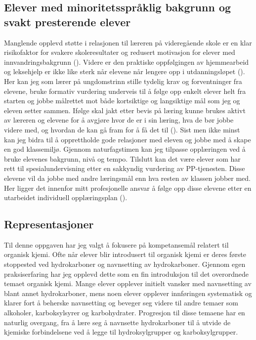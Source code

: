 \documentclass[main.tex]{subfiles}
\begin{document}
\subsection*{Elever med minoritetsspråklig bakgrunn og svakt presterende elever}

Manglende opplevd støtte i relasjonen til læreren på videregående skole er en klar risikofaktor for svakere skoleresultater og redusert motivasjon for elever med innvandringsbakgrunn (). Videre er den praktiske oppfølgingen av hjemmearbeid og leksehjelp er ikke like sterk når elevene når lengere opp i utdanningsløpet (). 
\newline\newline
Her kan jeg som lærer på ungdomstrinn stille tydelig krav og forventninger fra elevene, bruke formativ vurdering underveis til å følge opp enkelt elever helt fra starten og jobbe målrettet mot både kortsiktige og langsiktige mål som jeg og eleven setter sammen. Ifølge  skal jakt etter bevis på læring kunne brukes aktivt av læreren og elevene for å avgjøre hvor de er i sin læring, hva de bør jobbe videre med, og hvordan de kan gå fram for å få det til (). Sist men ikke minst kan jeg bidra til å opprettholde gode relasjoner med eleven og jobbe med å skape en god klassemiljø. Gjennom naturfagstimen kan jeg tilpasse opplæringen ved å bruke elevenes bakgrunn, nivå og tempo.
\newline\newline
Tilslutt kan det være elever som har rett til spesialundervisning etter en sakkyndig vurdering av PP-tjenesten. Disse elevene vil da jobbe med andre læringsmål enn hva resten av klassen jobber med. Her ligger det innenfor mitt profesjonelle ansvar å følge opp disse elevene etter en utarbeidet individuell opplæringsplan ().


\subsection*{Representasjoner}

Til denne oppgaven har jeg valgt å fokusere på kompetansemål relatert til organisk kjemi. Ofte når elever blir introdusert til organisk kjemi er deres første stoppested ved hydrokarboner og navnsetting av hydrokarboner. Gjennom egen praksiserfaring har jeg opplevd dette som en fin introduksjon til det overordnede temaet organisk kjemi. Mange elever opplever initielt vansker med navnsetting av blant annet hydrokarboner, mens noen elever opplever innføringen systematisk og klarer fort å beherske navnsetting og beveger seg videre til andre temaer som alkoholer, karboksylsyrer og karbohydrater. Progresjon til disse temaene har en naturlig overgang, fra å lære seg å navnsette hydrokarboner til å utvide de kjemiske forbindelsene ved å legge til hydroksylgrupper og karboksylgrupper. \newline
\end{document}
